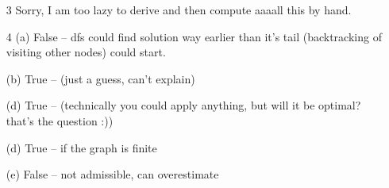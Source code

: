 \documentclass[12pt]{article}
\begin{document}
\begin{enumerate}
  (b) $\frac{\partial L(\theta)}{\partial \theta} = X^T X \theta + X^T X \theta - 2X^T y =$

  $= 2X^T X \theta - 2X^Ty = 0$. So, $X^TX \theta = X^Ty$.

  Solving for $\theta$ we get:

  $\theta^* = (X^T X)^-1 X^T y$.

  (c) computations can take longer if dimensions are high, but also there might be some precision errors
  while computing the inverse of the matrix, if it exists in the first place that is.

  \item[3]
  Sorry, I am too lazy to derive and then compute aaaall this by hand.

  \item[4]
  (a) False -- dfs could find solution way earlier than it's tail (backtracking of visiting other nodes) could start.

  (b) True -- (just a guess, can't explain)

  (d) True -- (technically you could apply anything, but will it be optimal? that's the question :))
  
  (d) True -- if the graph is finite

  (e) False -- not admissible, can overestimate


\end{enumerate}
\end{document}
